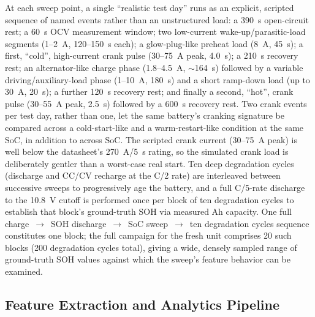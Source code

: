 \documentclass[conference]{IEEEtran}
\begin{document}
At each sweep point, a single ``realistic test day'' runs as an explicit, scripted sequence of named events rather than an unstructured load: a 390~s open-circuit rest; a 60~s OCV measurement window; two low-current wake-up/parasitic-load segments (1--2~A, 120--150~s each); a glow-plug-like preheat load (8~A, 45~s); a first, ``cold'', high-current crank pulse (30--75~A peak, 4.0~s); a 210~s recovery rest; an alternator-like charge phase (1.8--4.5~A, $\sim$164~s) followed by a variable driving/auxiliary-load phase (1--10~A, 180~s) and a short ramp-down load (up to 30~A, 20~s); a further 120~s recovery rest; and finally a second, ``hot'', crank pulse (30--55~A peak, 2.5~s) followed by a 600~s recovery rest. Two crank events per test day, rather than one, let the same battery's cranking signature be compared across a cold-start-like and a warm-restart-like condition at the same SoC, in addition to across SoC. The scripted crank current (30--75~A peak) is well below the datasheet's 270~A/5~s rating, so the simulated crank load is deliberately gentler than a worst-case real start. Ten deep degradation cycles (discharge and CC/CV recharge at the C/2 rate) are interleaved between successive sweeps to progressively age the battery, and a full C/5-rate discharge to the 10.8~V cutoff is performed once per block of ten degradation cycles to establish that block's ground-truth SOH via measured Ah capacity. One full charge~$\rightarrow$~SOH discharge~$\rightarrow$~SoC sweep~$\rightarrow$~ten degradation cycles sequence constitutes one block; the full campaign for the fresh unit comprises 20 such blocks (200 degradation cycles total), giving a wide, densely sampled range of ground-truth SOH values against which the sweep's feature behavior can be examined.

\subsection{Feature Extraction and Analytics Pipeline}
\label{sec:features}
\end{document}
